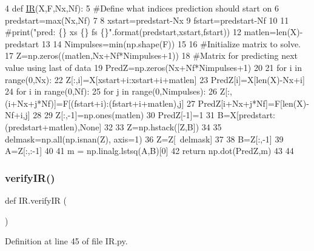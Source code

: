 \begin{DoxyCode}
4 \textcolor{keyword}{def }\hyperlink{namespaceIR_ae50bbbd323bc928d9e274617de58d72f}{IR}(X,F,Nx,Nf):
5     \textcolor{comment}{#Define what indices prediction should start on}
6     predstart=max(Nx,Nf)
7 
8     xstart=predstart-Nx
9     fstart=predstart-Nf
10 
11     \textcolor{comment}{#print("pred: \{\} xs \{\} fs \{\}".format(predstart,xstart,fstart))}
12     matlen=len(X)-predstart
13 
14     Nimpulses=min(np.shape(F))
15 
16     \textcolor{comment}{#Initialize matrix to solve.}
17     Z=np.zeros((matlen,Nx+Nf*Nimpulses+1))
18     \textcolor{comment}{#Matrix for predicting next value using last of data}
19     PredZ=np.zeros(Nx+Nf*Nimpulses+1)
20 
21     \textcolor{keywordflow}{for} i \textcolor{keywordflow}{in} range(0,Nx):
22         Z[:,i]=X[xstart+i:xstart+i+matlen]
23         PredZ[i]=X[len(X)-Nx+i]
24     \textcolor{keywordflow}{for} i \textcolor{keywordflow}{in} range(0,Nf):
25         \textcolor{keywordflow}{for} j \textcolor{keywordflow}{in} range(0,Nimpulses):
26             Z[:,(i+Nx+j*Nf)]=F[(fstart+i):(fstart+i+matlen),j]
27             PredZ[i+Nx+j*Nf]=F[len(X)-Nf+i,j]
28 
29     Z[:,-1]=np.ones(matlen)
30     PredZ[-1]=1
31     B=X[predstart:(predstart+matlen),\textcolor{keywordtype}{None}]
32 
33     Z=np.hstack([Z,B])
34 
35     delmask=np.all(np.isnan(Z), axis=1)
36     Z=Z[~delmask]
37 
38     B=Z[:,-1]
39     A=Z[:,:-1]
40 
41     m = np.linalg.lstsq(A,B)[0]
42     \textcolor{keywordflow}{return} np.dot(PredZ,m)
43 
44 
\end{DoxyCode}
\hypertarget{namespaceIR_aeaee615025a0b0c13500382312ba7745}{}\label{namespaceIR_aeaee615025a0b0c13500382312ba7745} 
\subsubsection{\texorpdfstring{verify\+I\+R()}{verifyIR()}}
{\footnotesize\ttfamily def I\+R.\+verify\+IR (\begin{DoxyParamCaption}{ }\end{DoxyParamCaption})}



Definition at line 45 of file I\+R.\+py.


